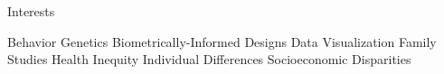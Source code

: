 \begin{rSection}{\textrm{Interests}} \begin{center}{\small Behavior Genetics \bigcdot Biometrically-Informed Designs \bigcdot Data Visualization \bigcdot Family Studies \bigcdot Health Inequity \bigcdot Individual Differences \bigcdot Socioeconomic Disparities} \end{center}
\end{rSection}